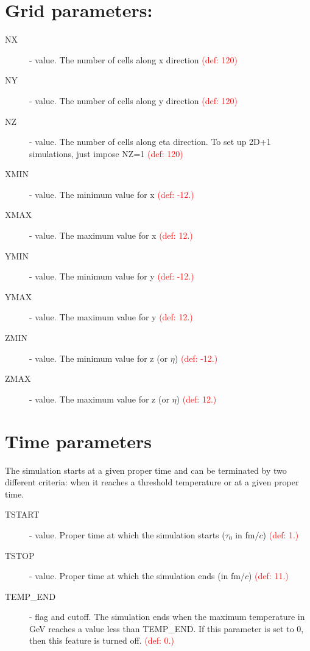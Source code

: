 \section{Grid parameters:}
\begin{description}
\item[NX] \integer - value. The number of cells along x direction \textcolor{red}{(def: 120)}
\item[NY] \integer - value. The number of cells along y direction \textcolor{red}{(def: 120)}
\item[NZ] \integer - value. The number of cells along eta direction. To set up 2D+1 simulations, just impose NZ=1 \textcolor{red}{(def: 120)}
\item[XMIN] \real - value. The minimum value for x \textcolor{red}{(def: -12.)}
\item[XMAX] \real - value. The maximum value for x \textcolor{red}{(def: 12.)}
\item[YMIN] \real - value. The minimum value for y \textcolor{red}{(def: -12.)}
\item[YMAX] \real - value. The maximum value for y \textcolor{red}{(def: 12.)}
\item[ZMIN] \real - value. The minimum value for z (or $\eta$) \textcolor{red}{(def: -12.)}
\item[ZMAX] \real - value. The maximum value for z (or $\eta$) \textcolor{red}{(def: 12.)}
\end{description}

\section{Time parameters}
The simulation starts at a given proper time and can be terminated by two different criteria: 
when it reaches a threshold temperature or at a given proper time.
\begin{description}
\item[TSTART] \real - value. Proper time at which the simulation starts ($\tau_0$ in fm$/c$) \textcolor{red}{(def: 1.)}
\item[TSTOP]  \real - value. Proper time at which the simulation ends (in fm$/c$) \textcolor{red}{(def: 11.)}
\item[TEMP\_END] \real - flag and cutoff. The simulation ends when the maximum temperature in GeV reaches a value less than TEMP\_END. If this parameter is set to 0, then this feature is turned off. \textcolor{red}{(def: 0.)}
\end{description}

